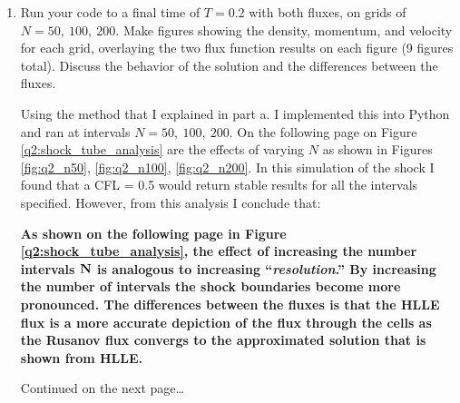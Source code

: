 \pagebreak
\begin{enumerate}[label=\alph*., start = 2]
    \item Run your code to a final time of $T= 0.2$ with both fluxes, on grids of $N= 50,\ 100,\ 200$.  Make figures  showing the density, momentum, and velocity for each grid, overlaying the two flux function results on each figure (9 figures total). Discuss the behavior of the solution and the differences between the fluxes.
    
    Using the method that I explained in part a. I implemented this into Python and ran at intervals $N = 50,\ 100,\ 200$. On the following page on Figure \ref{q2:shock_tube_analysis} are the effects of varying $N$ as shown in Figures \ref{fig:q2_n50}, \ref{fig:q2_n100}, \ref{fig:q2_n200}. In this simulation of the shock I found that a CFL = 0.5 would return stable results for all the intervals specified. However, from this analysis I conclude that:

    \begin{fminipage}{0.9\linewidth}
        \textbf{As shown on the following page in Figure \ref{q2:shock_tube_analysis}, the effect of increasing the number intervals $\bf N$ is analogous to increasing ``\textit{resolution}.'' By increasing the number of intervals the shock boundaries become more pronounced. The differences between the fluxes is that the HLLE flux is a more accurate depiction of the flux through the cells as the Rusanov flux convergs to the approximated solution that is shown from HLLE.}
    \end{fminipage}
    
    \vfill
    Continued on the next page\ldots


\end{enumerate}
